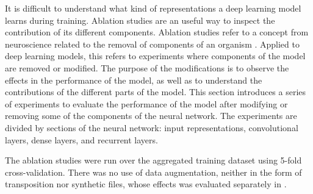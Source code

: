 
It is difficult to understand what kind of representations a
deep learning model learns during training. Ablation studies
are an useful way to inspect the contribution of its
different components. Ablation studies refer to a concept
from neuroscience related to the removal of components of an
organism \parencite{meyes2019ablation}. Applied to deep
learning models, this refers to experiments where components
of the model are removed or modified. The purpose of the
modifications is to observe the effects in the performance
of the model, as well as to understand the contributions of
the different parts of the model. This section introduces a
series of experiments to evaluate the performance of the
model after modifying or removing some of the components of
the neural network. The experiments are divided by sections
of the neural network: input representations, convolutional
layers, dense layers, and recurrent layers.

The ablation studies were run over the aggregated training
dataset using 5-fold cross-validation. There was no use of
data augmentation, neither in the form of transposition nor
synthetic files, whose effects was evaluated separately in
.
